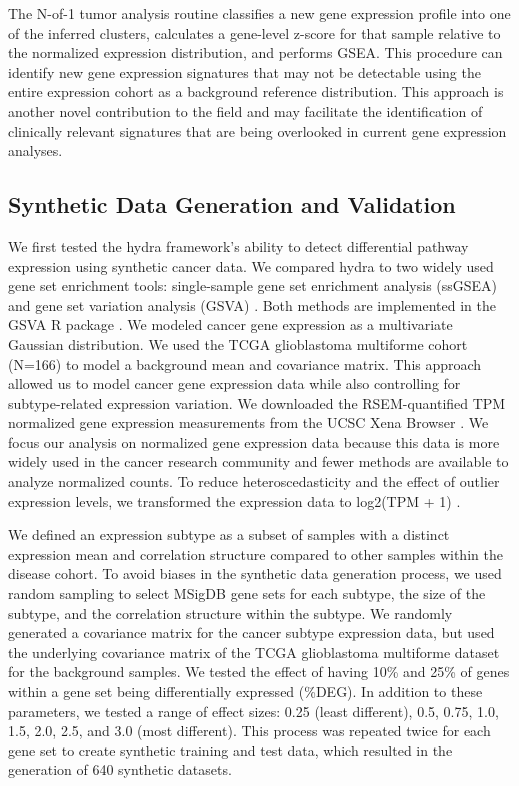 \documentclass[10pt,letterpaper]{article}
\begin{document}
The N-of-1 tumor analysis routine classifies a new gene expression profile into one of the inferred clusters, calculates a gene-level z-score for that sample relative to the normalized expression distribution, and performs GSEA. This procedure can identify new gene expression signatures that may not be detectable using the entire expression cohort as a background reference distribution. This approach is another novel contribution to the field and may facilitate the identification of clinically relevant signatures that are being overlooked in current gene expression analyses.

\subsection*{Synthetic Data Generation and Validation}

We first tested the hydra framework’s ability to detect differential pathway expression using synthetic cancer data. We compared hydra to two widely used gene set enrichment tools: single-sample gene set enrichment analysis (ssGSEA) and gene set variation analysis (GSVA) \cite{barbieSystematicRNAInterference2009, hanzelmannGSVAGeneSet2013, tarcaComparisonGeneSet2013}. Both methods are implemented in the GSVA R package \cite{hanzelmannGSVAGeneSet2013}. We modeled cancer gene expression as a multivariate Gaussian distribution. We used the TCGA glioblastoma multiforme cohort (N=166) to model a background mean and covariance matrix. This approach allowed us to model cancer gene expression data while also controlling for subtype-related expression variation. We downloaded the RSEM-quantified TPM normalized gene expression measurements from the UCSC Xena Browser \cite{goldmanUCSCXenaPlatform2018}. We focus our analysis on normalized gene expression data because this data is more widely used in the cancer research community and fewer methods are available to analyze normalized counts. To reduce heteroscedasticity and the effect of outlier expression levels, we transformed the expression data to log2(TPM + 1) \cite{zwienerTransformingRNASeqData2014}. 

We defined an expression subtype as a subset of samples with a distinct expression mean and correlation structure compared to other samples within the disease cohort. To avoid biases in the synthetic data generation process, we used random sampling to select MSigDB gene sets for each subtype, the size of the subtype, and the correlation structure within the subtype. We randomly generated a covariance matrix for the cancer subtype expression data, but used the underlying covariance matrix of the TCGA glioblastoma multiforme dataset for the background samples. We tested the effect of having 10\% and 25\% of genes within a gene set being differentially expressed (\%DEG). In addition to these parameters, we tested a range of effect sizes: 0.25 (least different), 0.5, 0.75, 1.0, 1.5, 2.0, 2.5, and 3.0 (most different). This process was repeated twice for each gene set to create synthetic training and test data, which resulted in the generation of 640 synthetic datasets. 
\end{document}
